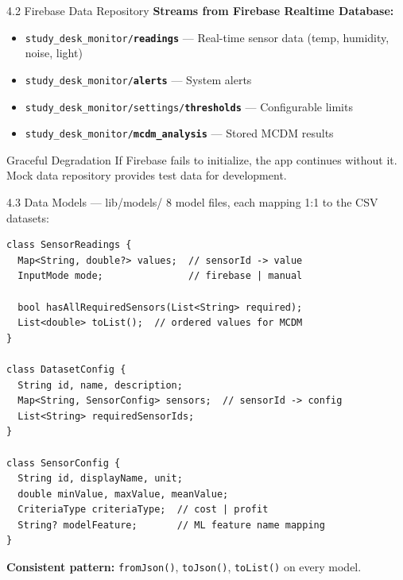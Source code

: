\documentclass[aspectratio=169]{beamer}
\begin{document}
\begin{frame}[allowframebreaks]{4.2 Firebase Data Repository}
  \textbf{Streams from Firebase Realtime Database:}
  \begin{itemize}
    \item \texttt{study\_desk\_monitor/\textbf{readings}} --- Real-time sensor data (temp, humidity, noise, light)
    \item \texttt{study\_desk\_monitor/\textbf{alerts}} --- System alerts
    \item \texttt{study\_desk\_monitor/settings/\textbf{thresholds}} --- Configurable limits
    \item \texttt{study\_desk\_monitor/\textbf{mcdm\_analysis}} --- Stored MCDM results
  \end{itemize}

  \vspace{0.3cm}
  \begin{block}{Graceful Degradation}
    If Firebase fails to initialize, the app continues without it.
    Mock data repository provides test data for development.
  \end{block}
\end{frame}

\begin{frame}{4.3 Data Models --- lib/models/}
  8 model files, each mapping 1:1 to the CSV datasets:

  \vspace{0.2cm}
  \begin{lstlisting}[style=dartstyle]
class SensorReadings {
  Map<String, double?> values;  // sensorId -> value
  InputMode mode;               // firebase | manual

  bool hasAllRequiredSensors(List<String> required);
  List<double> toList();  // ordered values for MCDM
}

class DatasetConfig {
  String id, name, description;
  Map<String, SensorConfig> sensors;  // sensorId -> config
  List<String> requiredSensorIds;
}

class SensorConfig {
  String id, displayName, unit;
  double minValue, maxValue, meanValue;
  CriteriaType criteriaType;  // cost | profit
  String? modelFeature;       // ML feature name mapping
}
  \end{lstlisting}

  \textbf{Consistent pattern:} \texttt{fromJson()}, \texttt{toJson()}, \texttt{toList()} on every model.
\end{frame}
\end{document}
